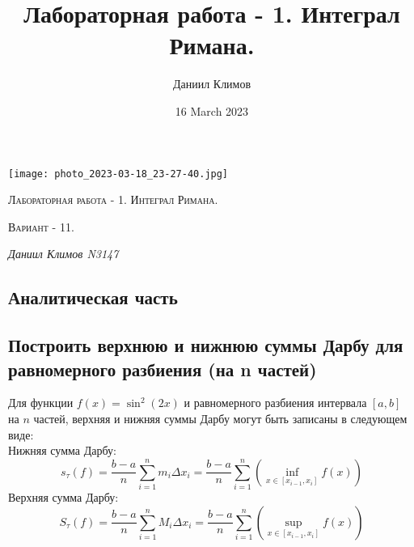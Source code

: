 \documentclass{article}
\title{Лабораторная работа - 1. Интеграл Римана.}
\author{Даниил Климов}
\date{16 March 2023}
\begin{document}
\begin{titlepage}
    \centering
    \texttt{[image: photo\_2023-03-18\_23-27-40.jpg]}\par\vspace{1cm}
    \vspace{1cm}
    {\scshape\Large Лабораторная работа - 1. Интеграл Римана.\par}
    {\scshape\LARGE Вариант - 11. \par}
    \vspace{1cm}
    \vspace{1.5cm}
    {\Large\itshape Даниил Климов N3147\par}
    \vfill
\end{titlepage}
\begin{center}
    
\section*{Аналитическая часть}
\subsection*{Построить верхнюю и нижнюю суммы Дарбу для равномерного разбиения (на n частей)}
\end{center}

Для функции $f(x)=\sin^2(2x)$ и равномерного разбиения интервала $[a,b]$ на $n$ частей, верхняя и нижняя суммы Дарбу могут быть записаны в следующем виде:\\
Нижняя сумма Дарбу:
$$s_\tau(f) = \frac{b-a}{n}\sum_{i=1}^n m_i \Delta x_i = \frac{b-a}{n}\sum_{i=1}^{n}\left(\inf_{x\in[x_{i-1},x_i]} f(x)\right)
$$
Верхняя сумма Дарбу:
$$S_\tau(f) = \frac{b-a}{n}\sum_{i=1}^n M_i \Delta x_i =
\frac{b-a}{n}\sum_{i=1}^{n}\left(\sup_{x\in[x_{i-1},x_i]} f(x)\right)
$$
\end{document}
